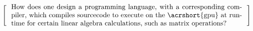 \[
  \left[
  \begin{minipage}{\textwidth}
  \centering
  \begin{minipage}{0.96\textwidth}
  How does one design a programming language, with a corresponding compiler, which compiles sourcecode to execute on the \acrshort{gpu} at runtime for certain linear algebra calculations, such as matrix operations?
  
  



  \end{minipage}
  \end{minipage}
    \right]
\]